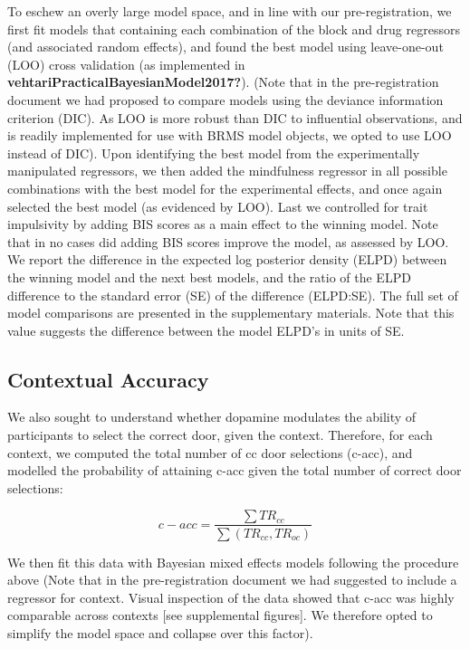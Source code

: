 \documentclass{article}
\begin{document}
To eschew an overly large model space, and in line with our
pre-registration, we first fit models that containing each combination
of the block and drug regressors (and associated random effects), and
found the best model using leave-one-out (LOO) cross validation (as
implemented in \textbf{vehtariPracticalBayesianModel2017?}). (Note that
in the pre-registration document we had proposed to compare models using
the deviance information criterion (DIC). As LOO is more robust than DIC
to influential observations, and is readily implemented for use with
BRMS model objects, we opted to use LOO instead of DIC). Upon
identifying the best model from the experimentally manipulated
regressors, we then added the mindfulness regressor in all possible
combinations with the best model for the experimental effects, and once
again selected the best model (as evidenced by LOO). Last we controlled
for trait impulsivity by adding BIS scores as a main effect to the
winning model. Note that in no cases did adding BIS scores improve the
model, as assessed by LOO. We report the difference in the expected log
posterior density (ELPD) between the winning model and the next best
models, and the ratio of the ELPD difference to the standard error (SE)
of the difference (ELPD:SE). The full set of model comparisons are
presented in the supplementary materials. Note that this value suggests
the difference between the model ELPD's in units of SE.

\hypertarget{contextual-accuracy}{%
\subsection{Contextual Accuracy}\label{contextual-accuracy}}

We also sought to understand whether dopamine modulates the ability of
participants to select the correct door, given the context. Therefore,
for each context, we computed the total number of cc door selections
(c-acc), and modelled the probability of attaining c-acc given the total
number of correct door selections:

\[
c-acc = \frac{\sum{TR_{cc}}}{\sum{(TR_{cc}, TR_{oc})}}
\]

We then fit this data with Bayesian mixed effects models following the
procedure above (Note that in the pre-registration document we had
suggested to include a regressor for context. Visual inspection of the
data showed that c-acc was highly comparable across contexts {[}see
supplemental figures{]}. We therefore opted to simplify the model space
and collapse over this factor).
\end{document}
